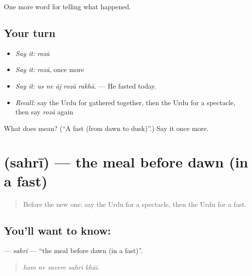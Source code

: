 \begin{grammarlens}[title={What you've built}]
One more word for telling what happened.
\end{grammarlens}

\subsection*{Your turn}
\begin{itemize}
\raggedright
  \item \emph{Say it:} \emph{rozā}
  \item \emph{Say it:} \emph{rozā}, once more
  \item \emph{Say it:} \emph{us ne āj rozā rakhā.} — He fasted today.
  \item \emph{Recall:} say the Urdu for gathered together, then the Urdu for a spectacle, then say \emph{rozā} again
\end{itemize}

\begin{tcolorbox}[breakable,colback=teal!4,colframe=teal!35!black,title={Before you move on}]
What does  mean? (\textquotedblleft{}A fast (from dawn to dusk)\textquotedblright{}.) Say it once more.
\end{tcolorbox}
\section[\texorpdfstring{\ur{سحری} (sahrī)}{سحری (sahrī)}]{ (sahrī) — the meal before dawn (in a fast)}

\label{lesson:UR-C322-sahri}



\begin{quote}
Before the new one: say the Urdu for a spectacle, then the Urdu for a fast.
\end{quote}

\subsection*{You'll want to know: }
\textbf{} — \emph{sahrī} — \textquotedblleft{}the meal before dawn (in a fast)\textquotedblright{}.

\begin{quote}
    
\end{quote}

\begin{quote}
\emph{ham ne savere sahrī khāī.}
\end{quote}


